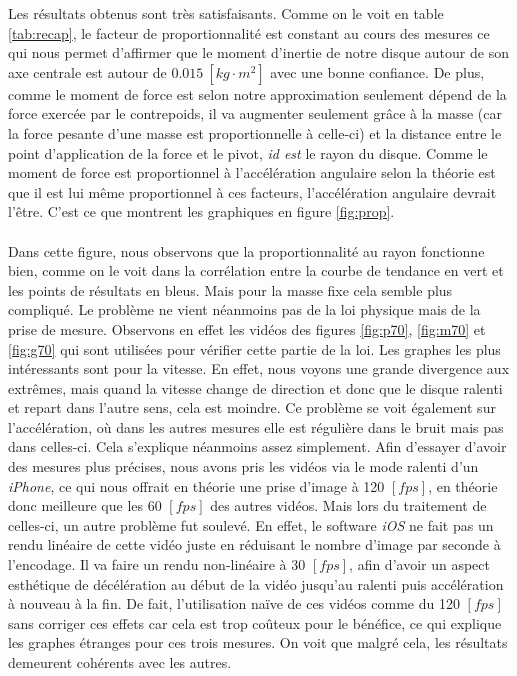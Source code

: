 Les résultats obtenus sont très satisfaisants. Comme on le voit en table \ref{tab:recap}, le facteur de proportionnalité est constant au cours des mesures ce qui nous permet d'affirmer que le moment d'inertie de notre disque autour de son axe centrale est autour de $0.015 \ [kg \cdot m^2]$ avec une bonne confiance. De plus, comme le moment de force est selon notre approximation seulement dépend de la force exercée par le contrepoids, il va augmenter seulement grâce à la masse (car la force pesante d'une masse est proportionnelle à celle-ci) et la distance entre le point d'application de la force et le pivot, \textit{id est} le rayon du disque. Comme le moment de force est proportionnel à l'accélération angulaire selon la théorie est que il est lui même proportionnel à ces facteurs, l'accélération angulaire devrait l'être. C'est ce que montrent les graphiques en figure \ref{fig:prop}.\\ \\
Dans cette figure, nous observons que la proportionnalité au rayon fonctionne bien, comme on le voit dans la corrélation entre la courbe de tendance en vert et les points de résultats en bleus. Mais pour la masse fixe cela semble plus compliqué. Le problème ne vient néanmoins pas de la loi physique mais de la prise de mesure. Observons en effet les vidéos des figures \ref{fig:p70}, \ref{fig:m70} et \ref{fig:g70} qui sont utilisées pour vérifier cette partie de la loi. Les graphes les plus intéressants sont pour la vitesse. En effet, nous voyons une grande divergence aux extrêmes, mais quand la vitesse change de direction et donc que le disque ralenti et repart dans l'autre sens, cela est moindre. Ce problème se voit également sur l'accélération, où dans les autres mesures elle est régulière dans le bruit mais pas dans celles-ci. Cela s'explique néanmoins assez simplement. Afin d'essayer d'avoir des mesures plus précises, nous avons pris les vidéos via le mode ralenti d'un \textit{iPhone}, ce qui nous offrait en théorie une prise d'image à 120 $[fps]$, en théorie donc meilleure que les 60 $[fps]$ des autres vidéos. Mais lors du traitement de celles-ci, un autre problème fut soulevé. En effet, le software \textit{iOS} ne fait pas un rendu linéaire de cette vidéo juste en réduisant le nombre d'image par seconde à l'encodage. Il va faire un rendu non-linéaire à 30 $[fps]$, afin d'avoir un aspect esthétique de décélération au début de la vidéo jusqu'au ralenti puis accélération à nouveau à la fin. De fait, l'utilisation naïve de ces vidéos comme du 120 $[fps]$ sans corriger ces effets car cela est trop coûteux pour le bénéfice, ce qui explique les graphes étranges pour ces trois mesures. On voit que malgré cela, les résultats demeurent cohérents avec les autres.\\
